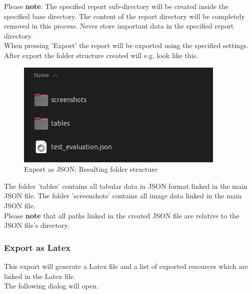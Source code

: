 Please \textbf{note}: The specified report sub-directory will be created inside the specified base directory.
The content of the report directory will be completely removed in this process.
Never store important data in the specified report directory. \\

When pressing 'Export' the report will be exported using the specified settings.
After export the folder structure created will e.g. look like this.

\begin{figure}[H]
    \hspace*{-2.5cm}
    \center
    \includegraphics[width=10cm,frame]{figures/export_json_result.png}
  \caption{Export as JSON: Resulting folder structure}
\end{figure}

The folder 'tables' contains all tabular data in JSON format linked in the main JSON file.
The folder 'screenshots' contains all image data linked in the main JSON file. \\

Please \textbf{note} that all paths linked in the created JSON file are relative to the 
JSON file's directory.

\subsubsection{Export as Latex}
\label{sec:report_export_latex}

This export will generate a Latex file and a list of exported resources which are linked in the Latex file. \\

The following dialog will open.


